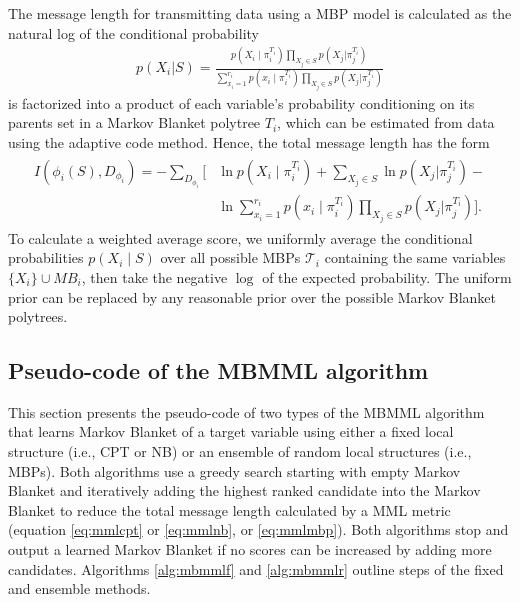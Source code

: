 \documentclass{svmult}
\begin{document}
The message length for transmitting data using a MBP model is calculated as the natural log of the conditional probability
\begin{align*}
p(X_i|S) = \frac{p(X_i \mid \pi_i^{T_i})\prod_{X_j \in S} p(X_j | \pi_j^{T_i})}{\sum_{x_i=1}^{r_i}p(x_i \mid \pi_i^{T_i})\prod_{X_j \in S} p(X_j | \pi_j^{T_i})}
\end{align*}
is factorized into a product of each variable's probability conditioning on its parents set in a Markov Blanket polytree $T_i$, which can be estimated from data using the adaptive code method. Hence, the total message length has the form 
\begin{align}
\label{eq:mmlmbp}
\begin{split}
I(\phi_i(S), D_{\phi_i}) = -\sum_{D_{\phi_i}} \biggl[
&\ln p(X_i\mid \pi_i^{T_i}) + \sum_{X_j \in S} \ln p(X_j | \pi_j^{T_i}) - \\
&\ln \sum_{x_i=1}^{r_i}p(x_i \mid \pi_i^{T_i})\prod_{X_j \in S} p(X_j | \pi_j^{T_i})
\biggr].
\end{split}
\end{align}
To calculate a weighted average score, we uniformly average the conditional probabilities $p(X_i\mid S)$ over all possible MBPs  $\mathcal{T}_i$ containing the same variables $\{X_i\} \cup MB_i$, then take the negative $\log$ of the expected probability. The uniform prior can be replaced by any reasonable prior over the possible Markov Blanket polytrees.


\subsection{Pseudo-code of the MBMML algorithm}
This section presents the pseudo-code of two types of the MBMML algorithm that learns Markov Blanket of a target variable using either a fixed local structure (i.e., CPT or NB) or an ensemble of random local structures (i.e., MBPs). Both algorithms use a greedy search starting with empty Markov Blanket and iteratively adding the highest ranked candidate into the Markov Blanket to reduce the total message length calculated by a MML metric (equation \ref{eq:mmlcpt} or \ref{eq:mmlnb}, or \ref{eq:mmlmbp}). Both algorithms stop and output a learned Markov Blanket if no scores can be increased by adding more candidates. Algorithms \ref{alg:mbmmlf} and \ref{alg:mbmmlr} outline steps of the fixed and ensemble methods.
\end{document}
